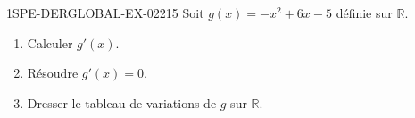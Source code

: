 \begin{exercice}{1SPE-DERGLOBAL-EX-022}{1}{5}
Soit $g(x) = -x^2 + 6x - 5$ définie sur $\mathbb{R}$.
\begin{enumerate}
\item Calculer $g'(x)$.
\item Résoudre $g'(x) = 0$.
\item Dresser le tableau de variations de $g$ sur $\mathbb{R}$.
\end{enumerate}
\end{exercice}
